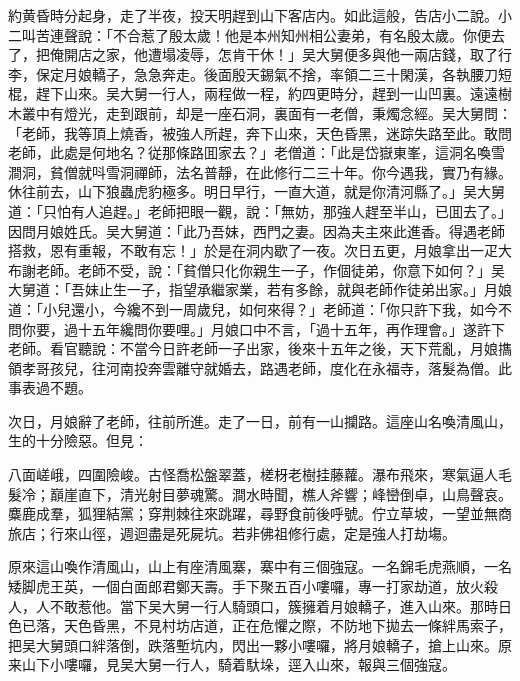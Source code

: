 約黄昏時分起身，走了半夜，投天明趕到山下客店内。如此這般，告店小二說。小二叫苦連聲說：「不合惹了殷太歲！他是本州知州相公妻弟，有名殷太歲。你便去了，把俺開店之家，他遭塌凌辱，怎肯干休！」吴大舅便多與他一兩店錢，取了行李，保定月娘轎子，急急奔走。後面殷天錫氣不捨，率領二三十閑漢，各執腰刀短棍，趕下山來。吴大舅一行人，兩程做一程，約四更時分，趕到一山凹裏。遠遠樹木叢中有燈光，走到跟前，却是一座石洞，裏面有一老僧，秉燭念經。吴大舅問：「老師，我等頂上燒香，被強人所趕，奔下山來，天色昏黑，迷踪失路至此。敢問老師，此處是何地名？従那條路囬家去？」老僧道：「此是岱嶽東峯，這洞名喚雪澗洞，貧僧就呌雪洞禪師，法名普靜，在此修行二三十年。你今遇我，實乃有緣。休往前去，山下狼蟲虎豹極多。明日早行，一直大道，就是你清河縣了。」吴大舅道：「只怕有人追趕。」老師把眼一觀，說：「無妨，那強人趕至半山，已囬去了。」因問月娘姓氏。吴大舅道：「此乃吾妹，西門之妻。因為夫主來此進香。得遇老師搭救，恩有重報，不敢有忘！」於是在洞内歇了一夜。次日五更，月娘拿出一疋大布謝老師。老師不受，說：「貧僧只化你親生一子，作個徒弟，你意下如何？」吴大舅道：「吾妹止生一子，指望承繼家業，若有多餘，就與老師作徒弟出家。」月娘道：「小兒還小，今纔不到一周歲兒，如何來得？」老師道：「你只許下我，如今不問你要，過十五年纔問你要哩。」月娘口中不言，「過十五年，再作理會。」遂許下老師。看官聽說：不當今日許老師一子出家，後來十五年之後，天下荒亂，月娘㩦領孝哥孩兒，往河南投奔雲離守就婚去，路遇老師，度化在永福寺，落髮為僧。此事表過不題。

次日，月娘辭了老師，往前所進。走了一日，前有一山攔路。這座山名喚清風山，生的十分險惡。但見：

\begin{myquote}
八面嵯峨，四圍險峻。古怪喬松盤翠蓋，槎枒老樹挂藤蘿。瀑布飛來，寒氣逼人毛髮冷；巔崖直下，清光射目夢魂驚。澗水時聞，樵人斧響；峰巒倒卓，山鳥聲哀。麋鹿成羣，狐狸結黨；穿荆棘往來跳躍，尋野食前後呼號。佇立草坡，一望並無商旅店；行來山徑，週迴盡是死屍坑。若非佛祖修行處，定是強人打劫塲。
\end{myquote}

原來這山喚作清風山，山上有座清風寨，寨中有三個強寇。一名錦毛虎燕順，一名矮脚虎王英，一個白面郎君鄭天壽。手下聚五百小嘍囉，專一打家劫道，放火殺人，人不敢惹他。當下吴大舅一行人騎頭口，簇擁着月娘轎子，進入山來。那時日色已落，天色昏黑，不見村坊店道，正在危懼之際，不防地下拋去一條絆馬索子，把吴大舅頭口絆落倒，跌落塹坑内，閃出一夥小嘍囉，將月娘轎子，搶上山來。原来山下小嘍囉，見吴大舅一行人，騎着馱垛，逕入山來，報與三個強寇。

